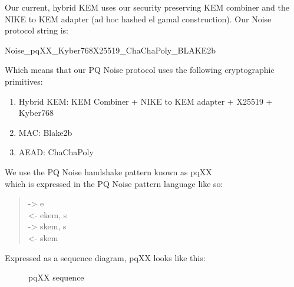 \documentclass{article}
\begin{document}
Our current, hybrid KEM uses our security preserving KEM combiner and the NIKE to KEM adapter
(ad hoc hashed el gamal construction). Our Noise protocol string is:

\vspace{.25cm}
Noise\_pqXX\_Kyber768X25519\_ChaChaPoly\_BLAKE2b
\vspace{.25cm}

Which means that our PQ Noise protocol uses the following cryptographic primitives:
\vspace{.5cm}


\begin{enumerate}
    \item Hybrid KEM: KEM Combiner + NIKE to KEM adapter + X25519 + Kyber768
    \item MAC: Blake2b
    \item AEAD: ChaChaPoly
\end{enumerate}

\vspace{.5cm}

We use the PQ Noise handshake pattern known as pqXX \\
which is expressed in the PQ Noise pattern language like so:

\vspace{.25cm}

\begin{quote}
   -> e\\
   <- ekem, s\\
   -> skem, s\\
   <- skem\\
\end{quote}

\vspace{.05cm}

Expressed as a sequence diagram, pqXX looks like this:

\vspace{5cm}

\begin{figure}[ht!]
\centering
{}
\caption{pqXX sequence}
\end{figure}
\end{document}
